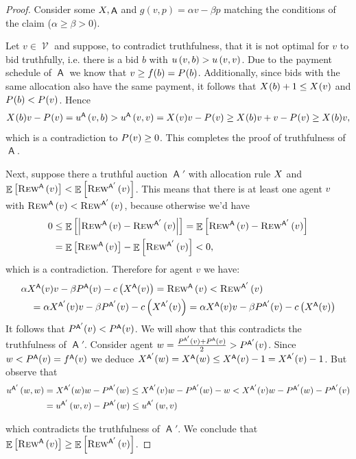 \documentclass[11pt,letterpaper]{article}
\newcommand{\sqbr}[1]{\left[ #1 \right]}
\newcommand{\brackets}[1]{\left( #1 \right)}
\DeclareMathOperator*{\E}{\bb{E}}
\newcommand{\bb}[1]{\mathbb{#1}}
\DeclareMathOperator{\A}{\auc{A}}
\DeclareMathOperator{\V}{\mathcal{V}}
\newcommand{\g}{g}
\theoremstyle{plain}
\newcommand{\auc}[1]{\mathsf{#1}}
\begin{document}
\begin{proof}
    Consider some $\alloc,\A$ and $\g(v,p)=\alpha v-\beta p$ matching the conditions of the claim ($\alpha\geq\beta>0$).
    
   Let $v\in\V$ and suppose, to contradict truthfulness, that it is not optimal for $v$ to bid truthfully, i.e. there is a bid $b$ with  $\util{v}{b}>\util{v}{v}$. Due to the payment schedule of $\A$ we know that $v\geq\filter(b)=\p{b}$. Additionally, since bids with the same allocation also have the same payment, it follows that $\x{b}+1\leq\x{v}$ and $\p{b}<\p{v}$. Hence
   \begin{align*}
       \x{b}v-\p{v}=\util[\A]{v}{b}>\util[\A]{v}{v}=\x{v}v-\p{v}\geq\x{b}v+v-\p{v}\geq\x{b}v,
   \end{align*}
   which is a contradiction to $\p{v}\geq0$. This completes the proof of truthfulness of $\A$.

   Next, suppose there a truthful auction $\A'$ with allocation rule $\alloc$ and $\E\sqbr{\trew[\A]{v}}<\E\sqbr{\trew[\A']{v}}$. This means that there is at least one agent $v$ with $\trew[\A]{v}<\trew[\A']{v}$, because otherwise we'd have
   \begin{align*}
       0&\leq\E\sqbr{\left|\trew[\A]{v}-\trew[\A']{v}\right|}=\E\sqbr{\trew[\A]{v}-\trew[\A']{v}}\\
       &=\E\sqbr{\trew[\A]{v}}-\E\sqbr{\trew[\A']{v}}<0,
   \end{align*}
   which is a contradiction. Therefore for agent $v$ we have:
   \begin{align*}
       &\alpha\x[\A]{v}v-\beta\p[\A]{v}-c\brackets{\x[\A]{v}}=\trew[\A]{v}<\trew[\A']{v}\\
       &\quad=\alpha\x[\A']{v}v-\beta\p[\A']{v}-c\brackets{\x[\A']{v}}
       =\alpha\x[\A]{v}v-\beta\p[\A']{v}-c\brackets{\x[\A]{v}}
   \end{align*}
   It follows that $\p[\A']{v}<\p[\A]{v}$. We will show that this contradicts the truthfulness of $\A'$. Consider agent ${w=\frac{\p[\A']{v}+\p[\A]{v}}{2}>\p[\A']{v}}$. Since $w<\p[\A]{v}=\filter[\A](v)$ we deduce $\x[\A']{w}=\x[\A]{w}\leq\x[\A]{v}-1=\x[\A']{v}-1$. But observe that
   \begin{align*}
       \util[\A']{w}{w}&=\x[\A']{w}w-\p[\A']{w}\leq\x[\A']{v}w-\p[\A']{w}-w<\x[\A']{v}w-\p[\A']{w}-\p[\A']{v}\\
        &=\util[\A']{w}{v}-\p[\A']{w} \leq\util[\A']{w}{v}
   \end{align*}

   which contradicts the truthfulness of $\A'$. We conclude that $\E\sqbr{\trew[\A]{v}}\geq\E\sqbr{\trew[\A']{v}}$.
\end{proof}
\end{document}
